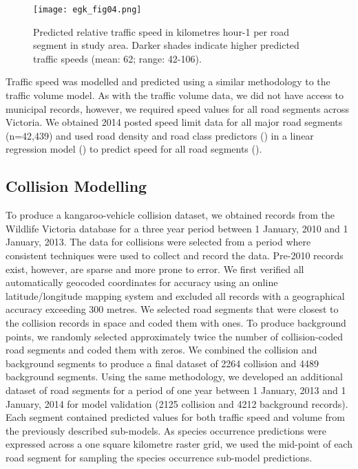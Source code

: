 \begin{figure*}[htp]
  \centering
  \texttt{[image: egk\_fig04.png]}
  \caption[Predicted relative traffic speed in Victoria]{Predicted relative traffic speed in kilometres hour-1 per road segment in study area. Darker shades indicate higher predicted traffic speeds (mean: 62; range: 42-106).}
  \label{egk_tspdmap}
\end{figure*}

Traffic speed was modelled and predicted using a similar methodology to the traffic volume model. As with the traffic volume data, we did not have access to municipal records, however, we required speed values for all road segments across Victoria. We obtained 2014 posted speed limit data for all major road segments (n=42,439) and used road density and road class predictors () in a linear regression model () to predict speed for all road segments (). 

\subsection{Collision Modelling}

To produce a kangaroo-vehicle collision dataset, we obtained records from the Wildlife Victoria database for a three year period between 1 January, 2010 and 1 January, 2013. The data for collisions were selected from a period where consistent techniques were used to collect and record the data.  Pre-2010 records exist, however, are sparse and more prone to error.  We first verified all automatically geocoded coordinates for accuracy using an online latitude/longitude mapping system \citep{gpsv13} and excluded all records with a geographical accuracy exceeding 300 metres. We selected road segments that were closest to the collision records in space and coded them with ones. To produce background points, we randomly selected approximately twice the number of collision-coded road segments and coded them with zeros. We combined the collision and background segments to produce a final dataset of 2264 collision and 4489 background segments. Using the same methodology, we developed an additional dataset of road segments for a period of one year between 1 January, 2013 and 1 January, 2014 for model validation (2125 collision and 4212 background records). Each segment contained predicted values for both traffic speed and volume from the previously described sub-models. As species occurrence predictions were expressed across a one square kilometre raster grid, we used the mid-point of each road segment for sampling the species occurrence sub-model predictions.

